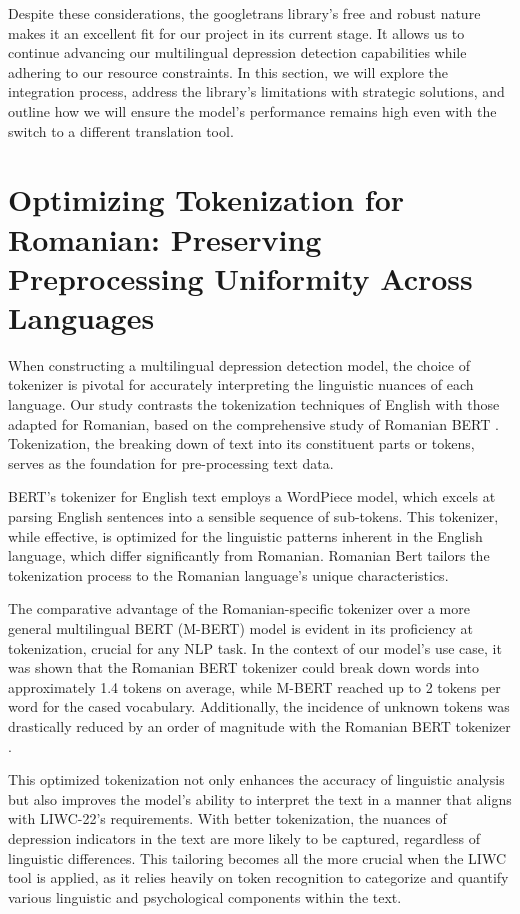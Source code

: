 Despite these considerations, the googletrans library's free and robust nature makes it an excellent fit for our project in its current stage. It allows us to continue advancing our multilingual depression detection capabilities while adhering to our resource constraints. In this section, we will explore the integration process, address the library’s limitations with strategic solutions, and outline how we will ensure the model's performance remains high even with the switch to a different translation tool.

\section{Optimizing Tokenization for Romanian: Preserving Preprocessing Uniformity Across Languages}

\quad When constructing a multilingual depression detection model, the choice of tokenizer is pivotal for accurately interpreting the linguistic nuances of each language. Our study contrasts the tokenization techniques of English with those adapted for Romanian, based on the comprehensive study of Romanian BERT \cite{dumitrescu2020birth}. Tokenization, the breaking down of text into its constituent parts or tokens, serves as the foundation for pre-processing text data.

BERT's tokenizer for English text employs a WordPiece model\cite{wu2016google}, which excels at parsing English sentences into a sensible sequence of sub-tokens. This tokenizer, while effective, is optimized for the linguistic patterns inherent in the English language, which differ significantly from Romanian. Romanian Bert \cite{dumitrescu2020birth} tailors the tokenization process to the Romanian language's unique characteristics.

The comparative advantage of the Romanian-specific tokenizer over a more general multilingual BERT (M-BERT) model is evident in its proficiency at tokenization, crucial for any NLP task. In the context of our model’s use case, it was shown that the Romanian BERT tokenizer could break down words into approximately 1.4 tokens on average, while M-BERT reached up to 2 tokens per word for the cased vocabulary. Additionally, the incidence of unknown tokens was drastically reduced by an order of magnitude with the Romanian BERT tokenizer \cite{dumitrescu2020birth}.

This optimized tokenization not only enhances the accuracy of linguistic analysis but also improves the model’s ability to interpret the text in a manner that aligns with LIWC-22's \cite{boyd2022development} requirements. With better tokenization, the nuances of depression indicators in the text are more likely to be captured, regardless of linguistic differences. This tailoring becomes all the more crucial when the LIWC tool is applied, as it relies heavily on token recognition to categorize and quantify various linguistic and psychological components within the text.


